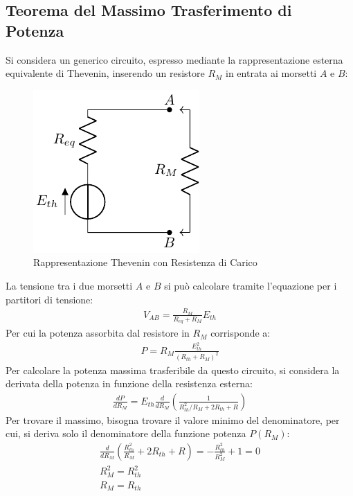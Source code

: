 \documentclass{article}
\numberwithin{equation}{subsection}
\begin{document}
\subsection{Teorema del Massimo Trasferimento di Potenza}

Si considera un generico circuito, espresso mediante la rappresentazione esterna equivalente di Thevenin, inserendo un resistore $R_M$ in entrata ai morsetti $A$ e $B$:
\begin{figure}[H]%
    \centering
    \includegraphics{rappresentazione-thevenin-carico.pdf}
    \caption{Rappresentazione Thevenin con Resistenza di Carico}
    \label{fig:rappresentazione-thevenin-carico}
\end{figure}
La tensione tra i due morsetti $A$ e $B$ si può calcolare tramite l'equazione per i partitori di tensione:
\begin{gather*}
    V_{AB}=\displaystyle\frac{R_M}{R_{eq}+R_M}E_{th}
\end{gather*}
Per cui la potenza assorbita dal resistore in $R_M$ corrisponde a:
\begin{gather*}
    P=R_M\displaystyle\frac{E_{th}^2}{(R_{th}+R_M)^2}
\end{gather*}
Per calcolare la potenza massima trasferibile da questo circuito, si considera la derivata della potenza in funzione della resistenza esterna:
\begin{gather*}
    \displaystyle\frac{dP}{dR_M}=E_{th}\frac{d}{dR_M}\left(\frac{1}{{R_{th}^2}/{R_M}+2R_{th}+R}\right)
\end{gather*}
Per trovare il massimo, bisogna trovare il valore minimo del denominatore, per cui, si deriva solo il denominatore della funzione potenza $P(R_M)$:
\begin{gather*}
    \displaystyle\frac{d}{dR_M}\left(\frac{R_{th}^2}{R_M}+2R_{th}+R\right)=-\frac{R_{th}^2}{R_M^2}+1=0\\
    R_M^2=R_{th}^2\\
    R_M=R_{th}
\end{gather*}
\end{document}
